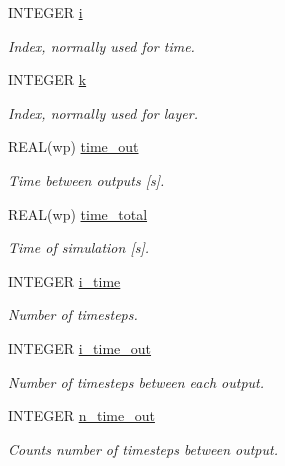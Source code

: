 \begin{DoxyCompactItemize}
INTEGER \hyperlink{namespacemo__data_ad15359b125bff66cb0f739e0eb5b01d4}{i}
\begin{DoxyCompactList}\small\item\em Index, normally used for time. \item\end{DoxyCompactList}\item 
INTEGER \hyperlink{namespacemo__data_afe6f17e4b469a746c68d9233d35ad11f}{k}
\begin{DoxyCompactList}\small\item\em Index, normally used for layer. \item\end{DoxyCompactList}\item 
REAL(wp) \hyperlink{namespacemo__data_a98be98c2961c1d3ccfdf5a52682b78d1}{time\_\-out}
\begin{DoxyCompactList}\small\item\em Time between outputs \mbox{[}s\mbox{]}. \item\end{DoxyCompactList}\item 
REAL(wp) \hyperlink{namespacemo__data_a6a4393d34e8f95d252b2bca2d30d5af3}{time\_\-total}
\begin{DoxyCompactList}\small\item\em Time of simulation \mbox{[}s\mbox{]}. \item\end{DoxyCompactList}\item 
INTEGER \hyperlink{namespacemo__data_abca60ca0614b7061c6ef58e6e6daa60f}{i\_\-time}
\begin{DoxyCompactList}\small\item\em Number of timesteps. \item\end{DoxyCompactList}\item 
INTEGER \hyperlink{namespacemo__data_aa28d05f6fec3b61de0fbd7b4aa67f6ae}{i\_\-time\_\-out}
\begin{DoxyCompactList}\small\item\em Number of timesteps between each output. \item\end{DoxyCompactList}\item 
INTEGER \hyperlink{namespacemo__data_a39a97d63744c18a6e9f3524d2dcc4154}{n\_\-time\_\-out}
\begin{DoxyCompactList}\small\item\em Counts number of timesteps between output. \item\end{DoxyCompactList}\item 

\end{DoxyCompactItemize}
